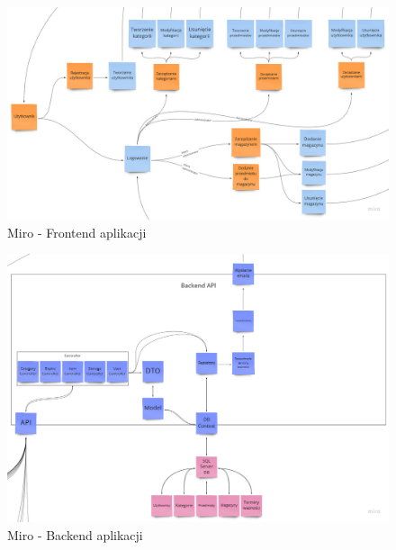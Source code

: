 \documentclass[12pt,a4paper]{article}
\begin{document}
		\begin{figure}[H]
			\centering
			\includegraphics[width=\textwidth]{img/miro_4.jpg}
			\caption{Miro - Frontend aplikacji}
			\label{fig:miro-front}
		\end{figure}
		\begin{figure}[H]
			\centering
			\includegraphics[width=\textwidth]{img/miro_3.jpg}
			\caption{Miro - Backend aplikacji}
			\label{fig:miro-backend}
		\end{figure}
	\newpage
	
\end{document}
